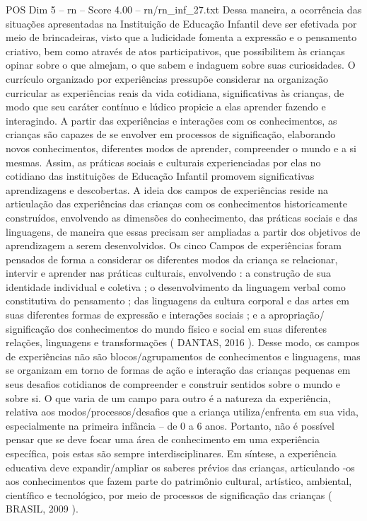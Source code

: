 \begin{textsample}{POS Dim 5 – rn – Score 4.00 – rn/rn\_inf\_27.txt}
Dessa maneira, a ocorrência das situações apresentadas na Instituição de Educação Infantil deve ser efetivada por meio de brincadeiras, visto que a ludicidade fomenta a expressão e o pensamento criativo, bem como através de atos participativos, que possibilitem às crianças opinar sobre o que almejam, o que sabem e indaguem sobre suas curiosidades.
O currículo organizado por experiências pressupõe considerar na organização curricular as experiências reais da vida cotidiana, significativas às crianças, de modo que seu caráter contínuo e lúdico propicie a elas aprender fazendo e interagindo.
A partir das experiências e interações com os conhecimentos, as crianças são capazes de se envolver em processos de significação, elaborando novos conhecimentos, diferentes modos de aprender, compreender o mundo e a si mesmas.
Assim, as práticas sociais e culturais experienciadas por elas no cotidiano das instituições de Educação Infantil promovem significativas aprendizagens e descobertas.
A ideia dos campos de experiências reside na articulação das experiências das crianças com os conhecimentos historicamente construídos, envolvendo as dimensões do conhecimento, das práticas sociais e das linguagens, de maneira que essas precisam ser ampliadas a partir dos objetivos de aprendizagem a serem desenvolvidos.
Os cinco Campos de experiências foram pensados de forma a considerar os diferentes modos da criança se relacionar, intervir e aprender nas práticas culturais, envolvendo : a construção de sua identidade individual e coletiva ; o desenvolvimento da linguagem verbal como constitutiva do pensamento ; das linguagens da cultura corporal e das artes em suas diferentes formas de expressão e interações sociais ; e a apropriação/ significação dos conhecimentos do mundo físico e social em suas diferentes relações, linguagens e transformações ( DANTAS, 2016 ).
Desse modo, os campos de experiências não são blocos/agrupamentos de conhecimentos e linguagens, mas se organizam em torno de formas de ação e interação das crianças pequenas em seus desafios cotidianos de compreender e construir sentidos sobre o mundo e sobre si.
O que varia de um campo para outro é a natureza da experiência, relativa aos modos/processos/desafios que a criança utiliza/enfrenta em sua vida, especialmente na primeira infância – de 0 a 6 anos.
Portanto, não é possível pensar que se deve focar uma área de conhecimento em uma experiência específica, pois estas são sempre interdisciplinares.
Em síntese, a experiência educativa deve expandir/ampliar os saberes prévios das crianças, articulando -os aos conhecimentos que fazem parte do patrimônio cultural, artístico, ambiental, científico e tecnológico, por meio de processos de significação das crianças ( BRASIL, 2009 ).

\end{textsample}
